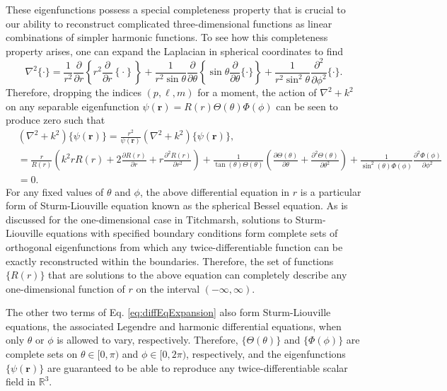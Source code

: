 These eigenfunctions possess a special completeness property that is crucial to our ability to reconstruct complicated three-dimensional functions as linear combinations of simpler harmonic functions. To see how this completeness property arises, one can expand the Laplacian in spherical coordinates to find
\begin{equation}
\nabla^2\{\cdot\} = \frac{1}{r^2}\frac{\partial}{\partial r}\left\{r^2\frac{\partial}{\partial r}\left\{\cdot\right\}\right\} + \frac{1}{r^2\sin\theta}\frac{\partial}{\partial \theta}\left\{\sin\theta\frac{\partial}{\partial \theta}\{\cdot\}\right\} + \frac{1}{r^2\sin^2\theta}\frac{\partial^2}{\partial\phi^2}\{\cdot\}.
\end{equation}
Therefore, dropping the indices $(p,\ell,m)$ for a moment, the action of $\nabla^2 + k^2$ on any separable eigenfunction $\psi(\mathbf{r}) = R(r)\Theta(\theta)\Phi(\phi)$ can be seen to produce zero such that
\begin{equation}\label{eq:diffEqExpansion}
\begin{split}
&\left(\nabla^2 + k^2\right)\{\psi(\mathbf{r})\} = \frac{r^2}{\psi(\mathbf{r})}\left(\nabla^2 + k^2\right)\{\psi(\mathbf{r})\},\\
&= \frac{r}{R(r)}\left(k^2rR(r) + 2\frac{\partial R(r)}{\partial r} + r\frac{\partial^2 R(r)}{\partial r^2}\right) + \frac{1}{\tan(\theta)\Theta(\theta)}\left(\frac{\partial\Theta(\theta)}{\partial\theta} + \frac{\partial^2\Theta(\theta)}{\partial\theta^2}\right) + \frac{1}{\sin^2(\theta)\Phi(\phi)}\frac{\partial^2\Phi(\phi)}{\partial\phi^2}\\
&= 0.
\end{split}
\end{equation}
For any fixed values of $\theta$ and $\phi$, the above differential equation in $r$ is a particular form of Sturm-Liouville equation known as the spherical Bessel equation. As is discussed for the one-dimensional case in Titchmarsh,\cite{titchmarsh1946eigenfunction} solutions to Sturm-Liouville equations with specified boundary conditions form complete sets of orthogonal eigenfunctions from which any twice-differentiable function can be exactly reconstructed within the boundaries. Therefore, the set of functions $\{R(r)\}$ that are solutions to the above equation can completely describe any one-dimensional function of $r$ on the interval $(-\infty,\infty)$.

The other two terms of Eq. \eqref{eq:diffEqExpansion} also form Sturm-Liouville equations, the associated Legendre and harmonic differential equations, when only $\theta$ or $\phi$ is allowed to vary, respectively. Therefore, $\{\Theta(\theta)\}$ and $\{\Phi(\phi)\}$ are complete sets on $\theta\in[0,\pi)$ and $\phi\in[0,2\pi)$, respectively, and the eigenfunctions $\{\psi(\mathbf{r})\}$ are guaranteed to be able to reproduce any twice-differentiable scalar field in $\mathbb{R}^3$.


